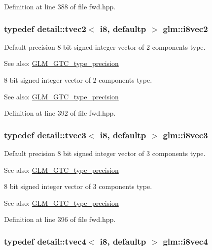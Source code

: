 Definition at line 388 of file fwd.hpp.\hypertarget{group__gtc__type__precision_gfd7bbd3878c298014276975f999a8677}{
\subsubsection[i8vec2]{\setlength{\rightskip}{0pt plus 5cm}typedef detail::tvec2$<$ i8, defaultp $>$ {\bf glm::i8vec2}}}
\label{group__gtc__type__precision_gfd7bbd3878c298014276975f999a8677}


Default precision 8 bit signed integer vector of 2 components type. \begin{Desc}
\item[See also:]\hyperlink{group__gtc__type__precision}{GLM\_\-GTC\_\-type\_\-precision}\end{Desc}
8 bit signed integer vector of 2 components type. \begin{Desc}
\item[See also:]\hyperlink{group__gtc__type__precision}{GLM\_\-GTC\_\-type\_\-precision} \end{Desc}


Definition at line 392 of file fwd.hpp.\hypertarget{group__gtc__type__precision_ge1e3127c58fbf1b6fbf28885cfd3dfad}{
\subsubsection[i8vec3]{\setlength{\rightskip}{0pt plus 5cm}typedef detail::tvec3$<$ i8, defaultp $>$ {\bf glm::i8vec3}}}
\label{group__gtc__type__precision_ge1e3127c58fbf1b6fbf28885cfd3dfad}


Default precision 8 bit signed integer vector of 3 components type. \begin{Desc}
\item[See also:]\hyperlink{group__gtc__type__precision}{GLM\_\-GTC\_\-type\_\-precision}\end{Desc}
8 bit signed integer vector of 3 components type. \begin{Desc}
\item[See also:]\hyperlink{group__gtc__type__precision}{GLM\_\-GTC\_\-type\_\-precision} \end{Desc}


Definition at line 396 of file fwd.hpp.\hypertarget{group__gtc__type__precision_g89bb5e6481ae11fb2599b71e36a390bb}{
\subsubsection[i8vec4]{\setlength{\rightskip}{0pt plus 5cm}typedef detail::tvec4$<$ i8, defaultp $>$ {\bf glm::i8vec4}}}
\label{group__gtc__type__precision_g89bb5e6481ae11fb2599b71e36a390bb}


